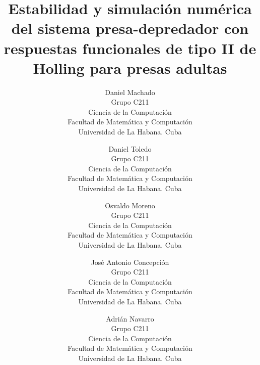 \documentclass{wscpaperproc}
\theoremstyle{wsc}
\begin{document}
%
%

\title{Estabilidad y simulaci\'on num\'erica del sistema presa-depredador con respuestas funcionales de tipo II de Holling para presas adultas}

\author{
	Daniel Machado \\[12pt]
	Grupo C211\\
	Ciencia de la Computaci\'on\\
	Facultad de Matem\'atica y Computaci\'on\\
	Universidad de La Habana. Cuba\\
	\and
	Daniel Toledo\\[12pt]
	Grupo C211\\
	Ciencia de la Computaci\'on\\
	Facultad de Matem\'atica y Computaci\'on\\
	Universidad de La Habana. Cuba\\
	\and
	Osvaldo Moreno\\[12pt]
	Grupo C211\\
	Ciencia de la Computaci\'on\\
	Facultad de Matem\'atica y Computaci\'on\\
	Universidad de La Habana. Cuba\\
	\and
	Jos\'e Antonio Concepci\'on\\[12pt]
	Grupo C211\\
	Ciencia de la Computaci\'on\\
	Facultad de Matem\'atica y Computaci\'on\\
	Universidad de La Habana. Cuba\\
	\and
	Adri\'an Navarro\\[12pt]
	Grupo C211\\
	Ciencia de la Computaci\'on\\
	Facultad de Matem\'atica y Computaci\'on\\
	Universidad de La Habana. Cuba\\
}
\end{document}
